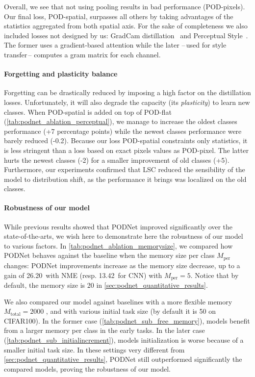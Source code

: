 Overall, we see that not using pooling results in bad performance (POD-pixels). Our final loss,
POD-spatial, surpasses all others by taking advantages of the statistics aggregated from both
spatial axis. For the sake of completeness we also included losses not designed by us: GradCam
distillation~\citep{dhar2019learning_without_memorizing_gradcam} and Perceptual
Style~\citep{johnson2016perceptual_losses}. The former uses a gradient-based attention while the
later --\,used for style transfer\,-- computes a gram matrix for each channel.

\paragraph{Forgetting and plasticity balance} Forgetting can be drastically reduced by imposing a
high factor on the distillation losses. Unfortunately, it will also degrade the capacity (its
\textit{plasticity}) to learn new classes. When POD-spatial is added on top of POD-flat
(\autoref{tab:podnet_ablation_perceptual}), we manage to increase the oldest classes performance (+7
percentage points) while the newest classes performance were barely reduced (-0.2\pp). Because our
loss POD-spatial constraints only statistics, it is less stringent than a loss based on exact pixels
values as POD-pixel. The latter hurts the newest classes (-2\pp) for a smaller improvement of old
classes (+5\pp). Furthermore, our experiments confirmed that LSC reduced the sensibility of the
model to distribution shift, as the performance it brings was localized on the old classes.

\label{sec:podnet_robustness}
\paragraph{Robustness of our model} While previous results showed that \ac{PODNet} improved significantly
over the state-of-the-arts, we wish here to demonstrate here the robustness of our model to various
factors. In \autoref{tab:podnet_ablation_memorysize}, we compared how \ac{PODNet} behaves against the baseline
when the memory size per class $M_{\text{per}}$ changes: \ac{PODNet} improvements increase as the memory
size decrease, up to a gain of 26.20\pp\ with \ac{NME} (resp. 13.42\pp\ for CNN) with $M_{\text{per}} =
    5$. Notice that by default, the memory size is 20 in \autoref{sec:podnet_quantitative_results}.

We also compared our model against baselines with a more flexible memory $M_{\text{total}} = 2000$
\citep{rebuffi2017icarl,wu2019bias_correction}, and with various initial task size (by default it is
50 on CIFAR100). In the former case (\autoref{tab:podnet_sub_free_memory}), models benefit from a larger
memory per class in the early tasks. In the later case (\autoref{tab:podnet_sub_initialincrement}), models
initialization is worse because of a smaller initial task size. In these settings very different
from \autoref{sec:podnet_quantitative_results}, \ac{PODNet} still outperformed significantly the compared
models, proving the robustness of our model.

